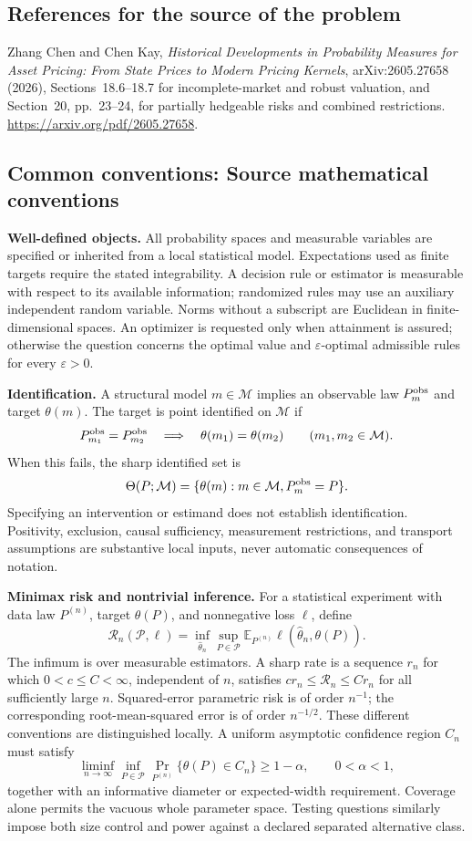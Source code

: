 \documentclass[11pt,a4paper]{article}
\newcommand{\E}{\mathbb E}
\begin{document}
\subsection*{References for the source of the problem}
Zhang Chen and Chen Kay, \emph{Historical Developments in Probability Measures for Asset Pricing: From State Prices to Modern Pricing Kernels}, arXiv:2605.27658 (2026), Sections~18.6--18.7 for incomplete-market and robust valuation, and Section~20, pp.~23--24, for partially hedgeable risks and combined restrictions. \url{https://arxiv.org/pdf/2605.27658}.

\subsection*{Common conventions: Source mathematical conventions}

\textbf{Well-defined objects.}
All probability spaces and measurable variables are specified or inherited
from a local statistical model. Expectations used as finite targets require
the stated integrability. A decision rule or estimator is measurable with
respect to its available information; randomized rules may use an auxiliary
independent random variable. Norms without a subscript are Euclidean in
finite-dimensional spaces. An optimizer is requested only when attainment
is assured; otherwise the question concerns the optimal value and
$\varepsilon$-optimal admissible rules for every $\varepsilon>0$.

\textbf{Identification.}
A structural model $m\in\mathcal M$ implies an observable law
$P_m^{\rm obs}$ and target $\theta(m)$. The target is point identified on
$\mathcal M$ if
\[
 P_{m_1}^{\rm obs}=P_{m_2}^{\rm obs}
 \quad\Longrightarrow\quad\theta(m_1)=\theta(m_2)
 \qquad(m_1,m_2\in\mathcal M).
\]
When this fails, the sharp identified set is
\[
 \Theta(P;\mathcal M)=\{\theta(m):m\in\mathcal M,
                                  P_m^{\rm obs}=P\}.
\]
Specifying an intervention or estimand does not establish identification.
Positivity, exclusion, causal sufficiency, measurement restrictions, and
transport assumptions are substantive local inputs, never automatic
consequences of notation.

\textbf{Minimax risk and nontrivial inference.}
For a statistical experiment with data law $P^{(n)}$, target $\theta(P)$,
and nonnegative loss $\ell$, define
\[
 \mathcal R_n(\mathcal P,\ell)
   =\inf_{\widehat\theta_n}\sup_{P\in\mathcal P}
      \E_{P^{(n)}}\ell(\widehat\theta_n,\theta(P)).
\]
The infimum is over measurable estimators. A sharp rate is a sequence
$r_n$ for which $0<c\leq C<\infty$, independent of $n$, satisfies
$c r_n\leq\mathcal R_n\leq C r_n$ for all sufficiently large $n$.
Squared-error parametric risk is of order $n^{-1}$; the corresponding
root-mean-squared error is of order $n^{-1/2}$. These different conventions
are distinguished locally. A uniform asymptotic confidence region $C_n$
must satisfy
\[
 \liminf_{n\to\infty}\inf_{P\in\mathcal P}
     \Pr_{P^{(n)}}\{\theta(P)\in C_n\}\geq 1-\alpha,
 \qquad 0<\alpha<1,
\]
together with an informative diameter or expected-width requirement.
Coverage alone permits the vacuous whole parameter space. Testing questions
similarly impose both size control and power against a declared separated
alternative class.
\end{document}

